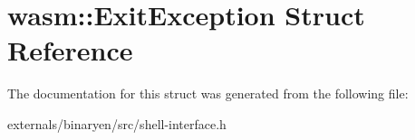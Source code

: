 \hypertarget{structwasm_1_1_exit_exception}{}\section{wasm\+:\+:Exit\+Exception Struct Reference}
\label{structwasm_1_1_exit_exception}


The documentation for this struct was generated from the following file\+:\begin{DoxyCompactItemize}
\item 
externals/binaryen/src/shell-\/interface.\+h\end{DoxyCompactItemize}

